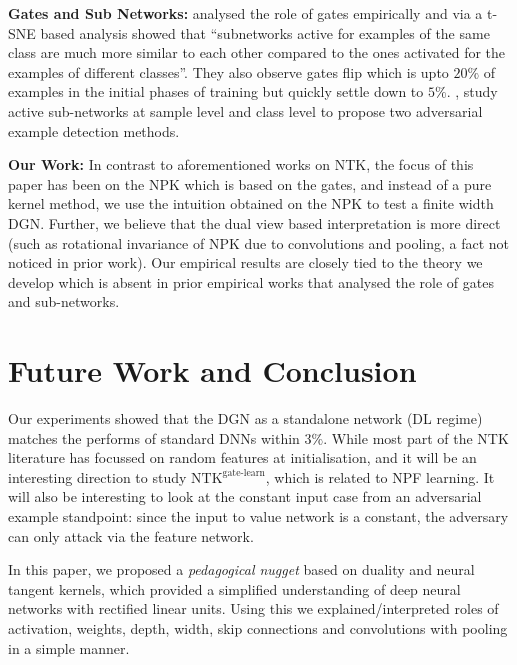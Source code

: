  \textbf{Gates and Sub Networks:} \cite{srivastava2014understanding} analysed the role of gates empirically and via a t-SNE based analysis showed that ``subnetworks active for examples of the same class are much more similar to each other compared to the ones activated for the examples of different classes''. They also observe gates flip which is upto $20\%$ of examples in the initial phases of training but quickly settle down to $5\%$. \cite{subnet1}, study active sub-networks at sample level and class level to propose two adversarial example detection methods.

\textbf{Our Work:} In contrast to aforementioned works on NTK, the focus of this paper has been on the NPK which is based on the gates, and instead of a pure kernel method, we use the intuition obtained on the NPK to test a finite width DGN. Further, we believe that the dual view based interpretation is more direct (such as rotational invariance of NPK due to convolutions and pooling, a fact not noticed in prior work). Our empirical results are closely tied to the theory we develop which is absent in prior empirical works that analysed the role of gates and sub-networks.
 
\section{Future Work and Conclusion}
Our experiments showed that the DGN as a standalone network (DL regime) matches the performs of standard DNNs within $3\%$.  While most part of the NTK literature has focussed on random features at initialisation, and it will be an interesting direction to study $\text{NTK}^{\text{gate-learn}}$, which is related to NPF learning. It will also be interesting to look at the constant input case from an adversarial example standpoint: since the input to value network is a constant, the adversary can only attack via the feature network. 

In this paper, we proposed a \emph{pedagogical nugget} based on duality and neural tangent kernels, which provided a simplified understanding of deep neural networks with rectified linear units. Using this we explained/interpreted roles of activation, weights, depth, width, skip connections and convolutions with pooling in a simple manner.
